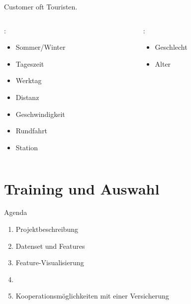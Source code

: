 \begin{frame}
\centering
{}
{
Customer oft Touristen.
\begin{columns}
\begin{column}[t]{0.5\textwidth}
:
\begin{itemize}
\item Sommer/Winter
\item Tageszeit
\item Werktag
\item Distanz
\item Geschwindigkeit
\item Rundfahrt
\item Station
\end{itemize}
\end{column}
\begin{column}[t]{0.5\textwidth}
:
\begin{itemize}
\item Geschlecht
\item Alter
\end{itemize}
\end{column}
\end{columns}
\vspace{1cm}
}
\end{frame}

\section{Training und Auswahl}

\begin{frame}{Agenda}
\centering
\myBlock[0.6]{}
{
\begin{enumerate}
\item Projektbeschreibung
\item Datenset und Features
\item Feature-Visualisierung
\item {}
\item Kooperationsmöglichkeiten mit einer Versicherung
\end{enumerate}
}
\end{frame}

